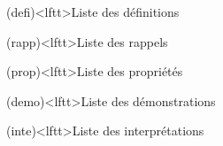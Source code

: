 \documentclass[../../main/main.tex]{subfiles}
\begin{document}
\vspace*{\fill}
\begin{boxes}
	\begin{tcb}(defi)<lftt>{Liste des définitions}
	\end{tcb}
	\begin{tcb}(rapp)<lftt>{Liste des rappels}
	\end{tcb}
	\begin{tcb}(prop)<lftt>{Liste des propriétés}
	\end{tcb}
	\begin{tcb}(demo)<lftt>{Liste des démonstrations}
	\end{tcb}
	\begin{tcb}(inte)<lftt>{Liste des interprétations}
	\end{tcb}

\end{boxes}
\end{document}
